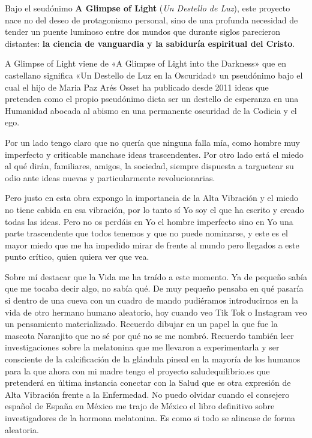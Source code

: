 \documentclass[12pt,twoside,openany]{book}
\begin{document}
Bajo el seudónimo \textbf{A Glimpse of Light} (\textit{Un Destello de Luz}), este proyecto nace no del deseo de protagonismo personal, sino de una profunda necesidad de tender un puente luminoso entre dos mundos que durante siglos parecieron distantes: \textbf{la ciencia de vanguardia y la sabiduría espiritual del Cristo}.

A Glimpse of Light viene de «A Glimpse of Light into the Darkness» que en castellano significa «Un Destello de Luz en la Oscuridad» un pseudónimo bajo el cual el hijo de Maria Paz Arés Osset ha publicado desde 2011 ideas que pretenden como el propio pseudónimo dicta ser un destello de esperanza en una Humanidad abocada al abismo en una permanente oscuridad de la Codicia y el ego.

Por un lado tengo claro que no quería que ninguna falla mía, como hombre muy imperfecto y criticable manchase ideas trascendentes. Por otro lado está el miedo al qué dirán, familiares, amigos, la sociedad, siempre dispuesta a targuetear su odio ante ideas nuevas y particularmente revolucionarias.

Pero justo en esta obra expongo la importancia de la Alta Vibración y el miedo no tiene cabida en esa vibración, por lo tanto sí Yo soy el que ha escrito y creado todas las ideas. Pero no os perdáis en Yo el hombre imperfecto sino en Yo una parte trascendente que todos tenemos y que no puede nominarse, y este es el mayor miedo que me ha impedido mirar de frente al mundo pero llegados a este punto crítico, quien quiera ver que vea.

Sobre mí destacar que la Vida me ha traído a este momento. Ya de pequeño sabía que me tocaba decir algo, no sabía qué. De muy pequeño pensaba en qué pasaría si dentro de una cueva con un cuadro de mando pudiéramos introducirnos en la vida de otro hermano humano aleatorio, hoy cuando veo Tik Tok o Instagram veo un pensamiento materializado. Recuerdo dibujar en un papel la que fue la mascota Naranjito que no sé por qué no se me nombró. Recuerdo también leer investigaciones sobre la melatonina que me llevaron a experimentarla y ser consciente de la calcificación de la glándula pineal en la mayoría de los humanos para la que ahora con mi madre tengo el proyecto saludequilibrio.es que pretenderá en última instancia conectar con la Salud que es otra expresión de Alta Vibración frente a la Enfermedad. No puedo olvidar cuando el consejero español de España en México me trajo de México el libro definitivo sobre investigadores de la hormona melatonina. Es como si todo se alinease de forma aleatoria.
\end{document}
